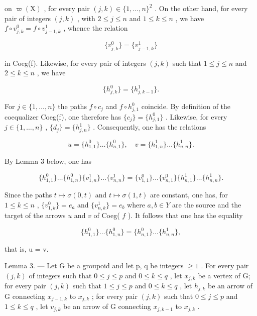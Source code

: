 on \(\varpi(\mathrm{X})\) , for every pair \((j,k) \in \{1, \ldots, n\}^2\) . On the other hand, for every pair of integers \((j,k)\) , with \(2 \leqslant j \leqslant n\) and \(1 \leqslant k \leqslant n\) , we have \(f \circ v_{j,k}^0 = f \circ v_{j-1,k}^1\) , whence the relation

\[
\{v _ {j, k} ^ {0} \} = \{v _ {j - 1, k} ^ {1} \}\tag{3}
\]

in Coeg(f). Likewise, for every pair of integers \((j,k)\) such that \(1 \leqslant j \leqslant n\) and \(2 \leqslant k \leqslant n\) , we have

\[
\{h _ {j, k} ^ {0} \} = \{h _ {j, k - 1} ^ {1} \}.\tag{4}
\]

For \(j \in \{1, \ldots, n\}\) the paths \(f \circ c_j\) and \(f \circ h_{j,1}^0\) coincide. By definition of the coequalizer Coeg(f), one therefore has \(\{c_j\} = \{h_{j,1}^0\}\) . Likewise, for every \(j \in \{1, \ldots, n\}\) , \(\{d_j\} = \{h_{j,n}^1\}\) . Consequently, one has the relations

\[
u = \{h _ {1, 1} ^ {0} \} \dots \{h _ {n, 1} ^ {0} \}, \quad v = \{h _ {1, n} ^ {1} \} \dots \{h _ {n, n} ^ {1} \}.
\]

By Lemma 3 below, one has

\[
\{h _ {1, 1} ^ {0} \} \dots \{h _ {1, n} ^ {0} \} \{v _ {1, n} ^ {1} \} \dots \{v _ {n, n} ^ {1} \} = \{v _ {1, 1} ^ {0} \} \dots \{v _ {n, 1} ^ {0} \} \{h _ {n, 1} ^ {1} \} \dots \{h _ {n, n} ^ {1} \}.
\]

Since the paths \(t \mapsto \sigma(0,t)\) and \(t \mapsto \sigma(1,t)\) are constant, one has, for \(1 \leqslant k \leqslant n\) , \(\{v_{1,k}^{0}\} = e_{a}\) and \(\{v_{n,k}^{1}\} = e_{b}\) where \(a,b \in Y\) are the source and the target of the arrows \(u\) and \(v\) of Coeg( \(f\) ). It follows that one has the equality

\[
\{h _ {1, 1} ^ {0} \} \dots \{h _ {1, n} ^ {0} \} = \{h _ {n, 1} ^ {0} \} \dots \{h _ {n, n} ^ {1} \},
\]

that is, u = v.

Lemma 3. --- Let G be a groupoid and let p, q be integers \(\geqslant 1\) . For every pair \((j, k)\) of integers such that \(0 \leqslant j \leqslant p\) and \(0 \leqslant k \leqslant q\) , let \(x_{j,k}\) be a vertex of G; for every pair \((j, k)\) such that \(1 \leqslant j \leqslant p\) and \(0 \leqslant k \leqslant q\) , let \(h_{j,k}\) be an arrow of G connecting \(x_{j-1,k}\) to \(x_{j,k}\) ; for every pair \((j, k)\) such that \(0 \leqslant j \leqslant p\) and \(1 \leqslant k \leqslant q\) , let \(v_{j,k}\) be an arrow of G connecting \(x_{j,k-1}\) to \(x_{j,k}\) .

